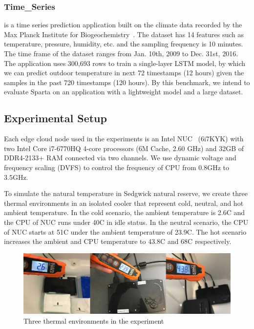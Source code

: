 \subsubsection{Time\_Series} is a time series prediction application built on the climate data recorded by the Max Planck Institute for Biogeochemistry~\cite{ref:jena}. The dataset has 14 features such as temperature, pressure, humidity, etc. and the sampling frequency is 10 minutes. The time frame of the dataset ranges from Jan. 10th, 2009 to Dec. 31st, 2016. The application uses 300,693 rows to train a single-layer LSTM model, by which we can predict outdoor temperature in next 72 timestamps (12 hours) given the samples in the past 720 timestamps (120 hours). By this benchmark, we intend to evaluate Sparta on an application with a lightweight model and a large dataset.


\subsection{Experimental Setup}

Each edge cloud node used in the experiments is an Intel NUC~\cite{ref:nuc} (6i7KYK) with two Intel Core i7-6770HQ 4-core processors (6M Cache, 2.60 GHz) and 32GB of DDR4-2133+ RAM connected via two channels. We use dynamic voltage and frequency scaling (DVFS) to control the frequency of CPU from 0.8GHz to 3.5GHz.

To simulate the natural temperature in Sedgwick natural reserve, we create three thermal environments in an isolated cooler that represent cold, neutral, and hot ambient temperature. In the cold scenario, the ambient temperature is 2.6\degree C and the CPU of NUC runs under 40\degree C in idle status. In the neutral scenario, the CPU of NUC starts at 51\degree C under the ambient temperature of 23.9\degree C. The hot scenario increases the ambient and CPU temperature to 43.8\degree C and 68\degree C respectively.

\begin{figure}
\includegraphics[width=\textwidth]{figures/thermal.jpg}
\caption{Three thermal environments in the experiment} \label{cold}
\end{figure}

